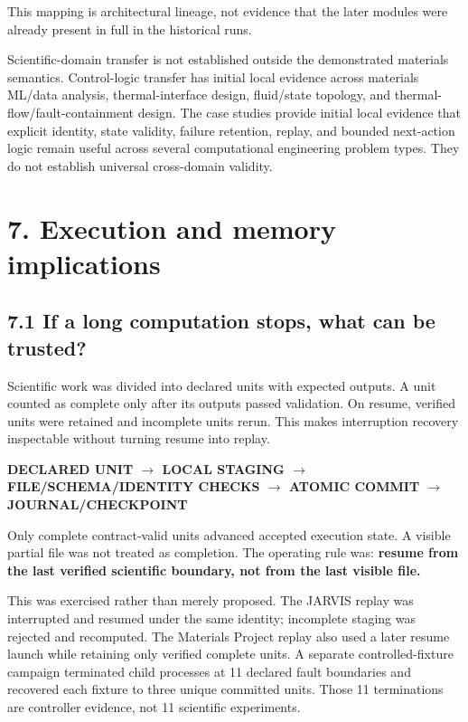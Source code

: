 \documentclass[10pt,a4paper]{article}
\begin{document}
This mapping is architectural lineage, not evidence that the later modules were already present in full in the historical runs.

Scientific-domain transfer is not established outside the demonstrated materials semantics. Control-logic transfer has initial local evidence across materials ML/data analysis, thermal-interface design, fluid/state topology, and thermal-flow/fault-containment design. The case studies provide initial local evidence that explicit identity, state validity, failure retention, replay, and bounded next-action logic remain useful across several computational engineering problem types. They do not establish universal cross-domain validity.

\section{7. Execution and memory implications}
\subsection{7.1 If a long computation stops, what can be trusted?}
Scientific work was divided into declared units with expected outputs. A unit counted as complete only after its outputs passed validation. On resume, verified units were retained and incomplete units rerun. This makes interruption recovery inspectable without turning resume into replay.

\begin{center}\small\bfseries
DECLARED UNIT $\rightarrow$ LOCAL STAGING $\rightarrow$ FILE/SCHEMA/IDENTITY CHECKS $\rightarrow$ ATOMIC COMMIT $\rightarrow$ JOURNAL/CHECKPOINT
\end{center}
Only complete contract-valid units advanced accepted execution state. A visible partial file was not treated as completion. The operating rule was: \textbf{resume from the last verified scientific boundary, not from the last visible file.}

This was exercised rather than merely proposed. The JARVIS replay was interrupted and resumed under the same identity; incomplete staging was rejected and recomputed. The Materials Project replay also used a later resume launch while retaining only verified complete units. A separate controlled-fixture campaign terminated child processes at 11 declared fault boundaries and recovered each fixture to three unique committed units. Those 11 terminations are controller evidence, not 11 scientific experiments.
\end{document}
